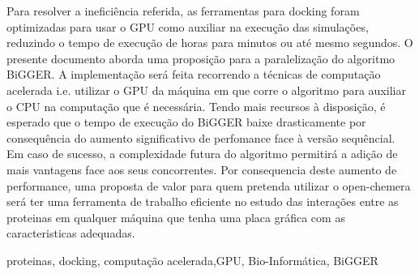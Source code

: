 Para resolver a ineficiência referida, as ferramentas para docking foram optimizadas para usar o GPU como auxiliar na execução das simulações, reduzindo o tempo de execução de horas para minutos ou até mesmo segundos.
O presente documento aborda uma proposição para a paralelização do algoritmo BiGGER.
 A implementação será feita recorrendo a técnicas de computação acelerada i.e. utilizar o GPU da máquina em que corre o algoritmo para auxiliar o CPU na computação que é necessária. 
 Tendo mais recursos à disposição, é esperado que o tempo de execução do BiGGER baixe drasticamente por consequência do aumento significativo de perfomance face à versão sequêncial.
Em caso de sucesso, a complexidade futura do algoritmo permitirá a adição de mais vantagens face aos seus concorrentes.
Por consequencia deste aumento de performance, uma proposta de valor para quem pretenda utilizar o open-chemera será ter uma ferramenta de trabalho eficiente no estudo das interações entre as proteinas em qualquer máquina que tenha uma placa gráfica com as caracteristicas adequadas.
%
%
%


\begin{keywords}
proteinas, docking, computação acelerada,GPU, Bio-Informática, BiGGER
\end{keywords}
